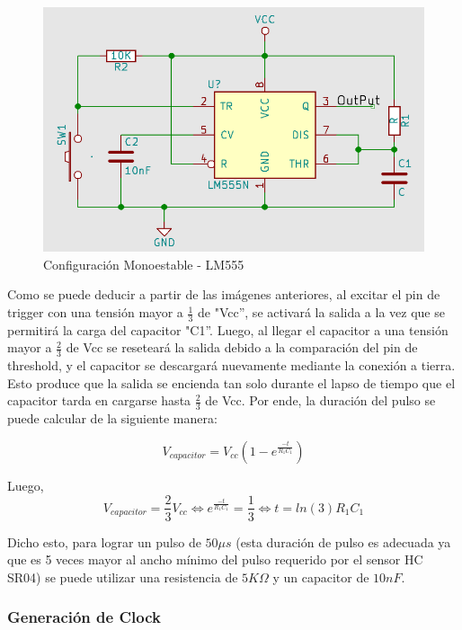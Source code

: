 \begin{figure}[H]
\centering
\includegraphics[scale=0.4]{monoestable555.PNG}
\caption{Configuración Monoestable - LM555}
\end{figure}

Como se puede deducir a partir de las imágenes anteriores, al excitar
el pin de trigger con una tensión mayor a $\frac{1}{3}$ de "Vcc'',
se activará la salida a la vez que se permitirá la carga del capacitor
"C1''. Luego, al llegar el capacitor a una tensión mayor a $\frac{2}{3}$
de Vcc se reseteará la salida debido a la comparación del pin de threshold,
y el capacitor se descargará nuevamente mediante la conexión a tierra.
Esto produce que la salida se encienda tan solo durante el lapso de
tiempo que el capacitor tarda en cargarse hasta $\frac{2}{3}$ de
Vcc. Por ende, la duración del pulso se puede calcular de la siguiente
manera:

\begin{equation}
V_{capacitor}=V_{cc}(1-e^{\frac{-t}{R_{1}C_{1}}})
\end{equation}

Luego, 
\begin{equation}
V_{capacitor}=\frac{2}{3}V_{cc}\Longleftrightarrow e^{\frac{-t}{R_{1}C_{1}}}=\frac{1}{3}\Longleftrightarrow t=ln(3)R_{1}C_{1}    
\end{equation}


Dicho esto, para lograr un pulso de $50\mu s$ (esta duración de pulso
es adecuada ya que es 5 veces mayor al ancho mínimo del pulso requerido
por el sensor HC SR04) se puede utilizar una resistencia de $5K\Omega$
y un capacitor de $10nF$.

\subsubsection{Generación de Clock}

